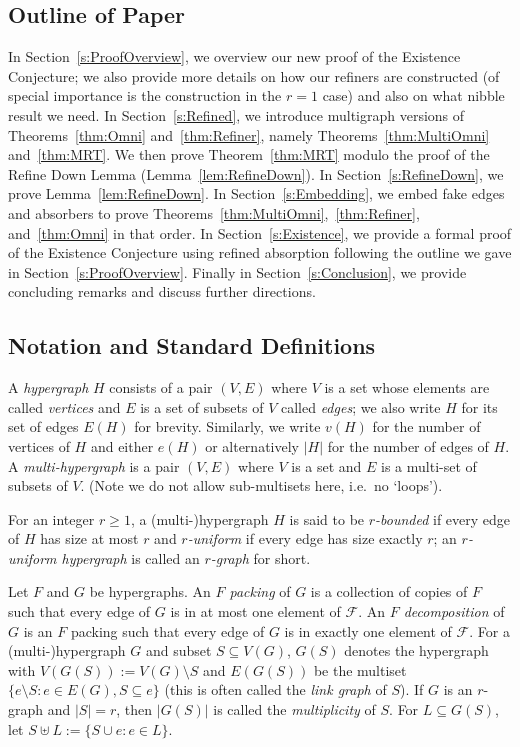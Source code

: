 \documentclass[11pt]{article}
\newcounter{i}
\theoremstyle{plain}
\theoremstyle{plain} %
\theoremstyle{definition}
\begin{document}
\subsection{Outline of Paper}

In Section~\ref{s:ProofOverview}, we overview our new proof of the Existence Conjecture; we also provide more details on how our refiners are constructed (of special importance is the construction in the $r=1$ case) and also on what nibble result we need.  In Section~\ref{s:Refined}, we introduce multigraph versions of Theorems~\ref{thm:Omni} and~\ref{thm:Refiner}, namely Theorems~\ref{thm:MultiOmni} and~\ref{thm:MRT}. We then prove Theorem~\ref{thm:MRT} modulo the proof of the Refine Down Lemma (Lemma~\ref{lem:RefineDown}). In Section~\ref{s:RefineDown}, we prove Lemma~\ref{lem:RefineDown}. In Section~\ref{s:Embedding}, we embed fake edges and absorbers to prove Theorems~\ref{thm:MultiOmni},~\ref{thm:Refiner}, and~\ref{thm:Omni} in that order.  In Section~\ref{s:Existence}, we provide a formal proof of the Existence Conjecture using refined absorption following the outline we gave in Section~\ref{s:ProofOverview}.  Finally in Section~\ref{s:Conclusion}, we provide concluding remarks and discuss further directions.

\subsection{Notation and Standard Definitions}\label{ss:Notation}

A \emph{hypergraph} $H$ consists of a pair $(V, E)$ where $V$ is a set whose elements are called \emph{vertices} and $E$ is a
set of subsets of $V$ called \emph{edges}; we also write $H$ for its set of edges $E(H)$ for brevity. Similarly, we write $v(H)$ for the number of vertices of $H$ and either $e(H)$ or alternatively $|H|$ for the number of edges of $H$. A \emph{multi-hypergraph} is a pair $(V,E)$ where $V$ is a set and $E$ is a multi-set of subsets of $V$. (Note we do not allow sub-multisets here, i.e.~no `loops').

For an integer $r\ge 1$, a (multi-)hypergraph $H$ is said to be \emph{$r$-bounded} if every edge of $H$ has size at most $r$ and  \emph{$r$-uniform} if every edge has size exactly $r$; an \emph{$r$-uniform hypergraph} is called an \emph{$r$-graph} for short.

Let $F$ and $G$ be hypergraphs. An \emph{$F$ packing} of $G$ is a collection of copies of $F$ such that every edge of $G$ is in at most one element of $\mathcal{F}$.  An \emph{$F$ decomposition} of $G$ is an $F$ packing such that every edge of $G$ is in exactly one element of $\mathcal{F}$. For a (multi-)hypergraph $G$ and subset $S\subseteq V(G)$, $G(S)$ denotes the hypergraph with $V(G(S)):=V(G)\setminus S$ and $E(G(S))$ be the multiset $\{e\setminus S: e\in E(G), S\subseteq e\}$ (this is often called the \emph{link graph} of $S$). If $G$ is an $r$-graph and $|S|=r$, then $|G(S)|$ is called the \emph{multiplicity} of $S$. For $L \subseteq G(S)$, let $S \uplus L := \{S \cup e : e \in L\}$.
\end{document}
